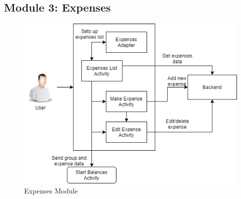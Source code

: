 \documentclass[conference]{IEEEtran}
\begin{document}
\subsection{Module 3: Expenses}
    \begin{figure}[H]
        \centerline{\includegraphics[scale=0.3]{img/flowcharts/flowchart-module-expenses.png}}
        \caption{Expenses Module}
        \label{fig:expenses-module-flowchart}
    \end{figure}
\end{document}
